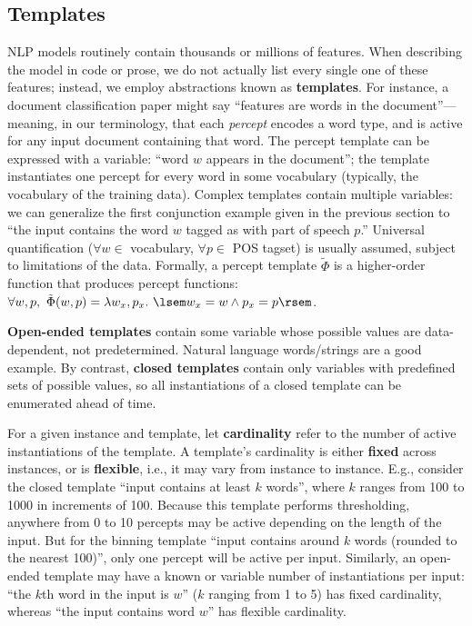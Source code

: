 \documentclass[11pt,letterpaper]{article}
\begin{document}
\subsection{Templates}

NLP models routinely contain thousands or millions of features. 
When describing the model in code or prose, we do not actually list every single one of these features; 
instead, we employ abstractions known as \textbf{templates}. 
For instance, a document classification paper might say ``features are words in the document''---meaning, 
in our terminology, that each {\em percept} encodes a word type, and is active for any input document containing that word.
The percept template can be expressed with a variable: ``word $w$ appears in the document''; 
the template instantiates one percept for every word in some vocabulary 
(typically, the vocabulary of the training data). 
Complex templates contain multiple variables: we can generalize the first conjunction example given in the previous section to 
``the input contains the word $w$ tagged as with part of speech $p$.'' 
Universal quantification ($\forall w \in$ vocabulary, $\forall p \in$ POS tagset) 
is usually assumed, subject to limitations of the data.
Formally, a percept template $\tilde{\Phi}$ is a higher-order function 
that produces percept functions: $\forall w,p,\ \tilde{\Phi}(w, p) = \lambda w_x,p_x.\ \lsem w_x=w \wedge p_x=p \rsem$.

{\bf Open-ended templates} contain some variable whose possible values are data-dependent, not predetermined. 
Natural language words/strings are a good example.
By contrast, {\bf closed templates} contain only variables with predefined sets of possible values, 
so all instantiations of a closed template can be enumerated ahead of time. 

For a given instance and template, let \textbf{cardinality} refer to the number of active instantiations of the template.
A template's cardinality is either \textbf{fixed} across instances, or is \textbf{flexible}, i.e., it may vary from instance to instance.
E.g., consider the closed template ``input contains at least $k$ words'', where $k$ ranges from 100 to 1000 in increments of 100.
Because this template performs thresholding, anywhere from 0 to 10 percepts may be active depending on the length of the input.
But for the binning template ``input contains around $k$ words (rounded to the nearest 100)'', only one percept 
will be active per input. Similarly, an open-ended template may have a known or variable number of instantiations per input: 
``the $k$th word in the input is $w$'' ($k$ ranging from 1 to 5) has fixed cardinality, whereas 
``the input contains word $w$'' has flexible cardinality.
\end{document}
